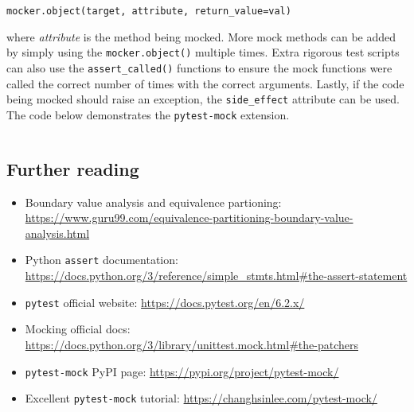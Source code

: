 \documentclass[11pt]{article}
\begin{document}
\vspace{\baselineskip}
\noindent
\texttt{mocker.object(target, attribute, return_value=val)}
\vspace{\baselineskip}

\noindent
where \textit{attribute} is the method being mocked. More mock methods can be added by simply using the \texttt{mocker.object()} multiple times. Extra rigorous test scripts can also use the \texttt{assert_called()} functions to ensure the mock functions were called the correct number of times with the correct arguments. Lastly, if the code being mocked should raise an exception, the \texttt{side_effect} attribute can be used. The code below demonstrates the \texttt{pytest-mock} extension.

\inputminted[]{python}{python_examples/pytest-mock_example.py}

\subsection{Further reading}

\begin{itemize}
    \item Boundary value analysis and equivalence partioning: \url{https://www.guru99.com/equivalence-partitioning-boundary-value-analysis.html}
    \item Python \texttt{assert} documentation: \url{https://docs.python.org/3/reference/simple_stmts.html#the-assert-statement}
    \item \texttt{pytest} official website: \url{https://docs.pytest.org/en/6.2.x/}
    \item Mocking official docs: \url{https://docs.python.org/3/library/unittest.mock.html#the-patchers}
    \item \texttt{pytest-mock} PyPI page: \url{https://pypi.org/project/pytest-mock/}
    \item Excellent \texttt{pytest-mock} tutorial: \url{https://changhsinlee.com/pytest-mock/}
\end{itemize}

%
\end{document}
